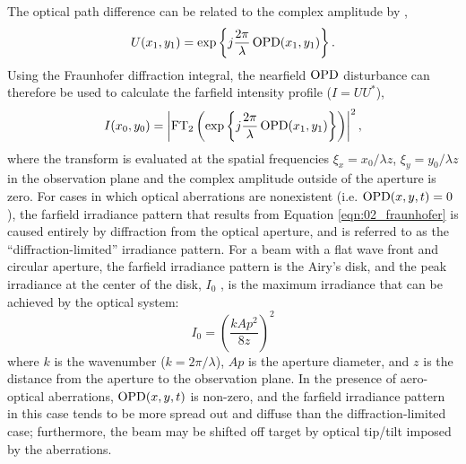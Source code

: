 The optical path difference can be related to the complex amplitude by \cite{Cicchiello-1997-RHxhNMxj},
\begin{equation}
  U(x_1,y_1) = \exp\left\{j\frac{2\pi}{\lambda}\operatorname{OPD}(x_1,y_1)\right\} \textrm{.}
\end{equation}
Using the Fraunhofer diffraction integral, the nearfield $\operatorname{OPD}$ disturbance can therefore be used to calculate the farfield intensity profile ($I = UU^*$),
\begin{equation}
  I(x_0,y_0) = \left|\operatorname{FT}_2\left(\exp\left\{j\frac{2\pi}{\lambda}\operatorname{OPD}(x_1,y_1)\right\}\right)\right|^2 \textrm{,}
\end{equation}
where the transform is evaluated at the spatial frequencies $\xi_x = x_0/\lambda z$, $\xi_y = y_0/\lambda z$ in the observation plane and the complex amplitude outside of the aperture is zero.
For cases in which optical aberrations are nonexistent (i.e. $\operatorname{OPD}(x,y,t)=0$), the farfield irradiance pattern that results from Equation \ref{eqn:02_fraunhofer} is caused entirely by diffraction from the optical aperture, and is referred to as the ``diffraction-limited'' irradiance pattern.
For a beam with a flat wave front and circular aperture, the farfield irradiance pattern is the Airy’s disk, and the peak irradiance at the center of the disk, $I_0$ , is the maximum irradiance that can be achieved by the optical system:
\begin{equation}
  I_0 = \left(\frac{kAp^2}{8z}\right)^2
  \label{eqn:02_airy_pattern}
\end{equation}
where $k$ is the wavenumber ($k=2\pi /\lambda$), $Ap$ is the aperture diameter, and $z$ is the distance from the aperture to the observation plane.
In the presence of aero-optical aberrations, $\operatorname{OPD}(x,y,t)$ is non-zero, and the farfield irradiance pattern in this case tends to be more spread out and diffuse than the diffraction-limited case; furthermore, the beam may be shifted off target by optical tip/tilt imposed by the aberrations.

